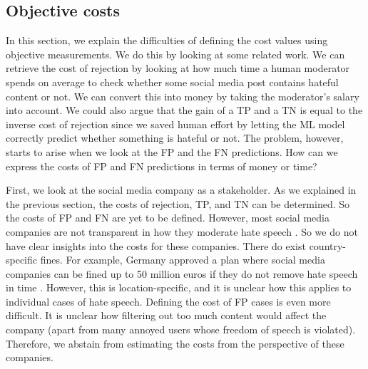 \subsection{Objective costs}
In this section, we explain the difficulties of defining the cost values using objective measurements. We do this by looking at some related work. We can retrieve the cost of rejection by looking at how much time a human moderator spends on average to check whether some social media post contains hateful content or not. We can convert this into money by taking the moderator’s salary into account. We could also argue that the gain of a TP and a TN is equal to the inverse cost of rejection since we saved human effort by letting the ML model correctly predict whether something is hateful or not. The problem, however, starts to arise when we look at the FP and the FN predictions. How can we express the costs of FP and FN predictions in terms of money or time?

First, we look at the social media company as a stakeholder. As we explained in the previous section, the costs of rejection, TP, and TN can be determined. So the costs of FP and FN are yet to be defined. However, most social media companies are not transparent in how they moderate hate speech \cite{klonick2017new}. So we do not have clear insights into the costs for these companies. There do exist country-specific fines. For example, Germany approved a plan where social media companies can be fined up to 50 million euros if they do not remove hate speech in time \cite{bbc-firms-face-fine-germany}. However, this is location-specific, and it is unclear how this applies to individual cases of hate speech. Defining the cost of FP cases is even more difficult. It is unclear how filtering out too much content would affect the company (apart from many annoyed users whose freedom of speech is violated). Therefore, we abstain from estimating the costs from the perspective of these companies.

